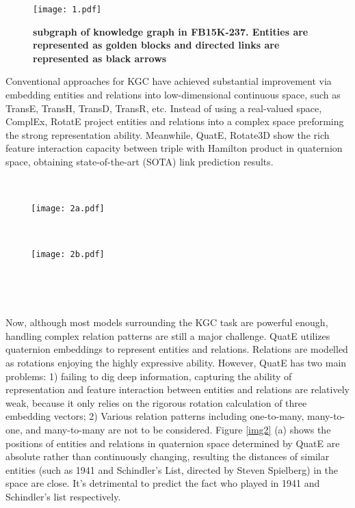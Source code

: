 \documentclass[letterpaper]{article} \usepackage{aaai20}  \usepackage{times}  \usepackage{helvet} \usepackage{courier}  \usepackage[hyphens]{url}  \usepackage{graphicx} \usepackage{lineno,hyperref,amsmath,amssymb}
\begin{document}
\begin{figure}[h]
    \centering
    \texttt{[image: 1.pdf]}
    \caption{\textbf{subgraph of knowledge graph in FB15K-237. Entities are represented as golden blocks and directed links are represented as black arrows}}
    \label{img1}
\end{figure}

Conventional approaches for KGC have achieved substantial improvement via embedding entities and relations into low-dimensional continuous space, such as TransE\cite{bordes2013translating}, TransH\cite{wang2014knowledge}, TransD\cite{ji2015knowledge}, TransR\cite{lin2015learning}, etc. Instead of using a real-valued space, ComplEx\cite{trouillon2016complex}, RotatE\cite{sun2019rotate} project entities and relations into a complex space preforming the strong representation ability. Meanwhile, QuatE\cite{zhang2019quaternion}, Rotate3D\cite{gao2020rotate3d} show the rich feature interaction capacity between triple with Hamilton product in quaternion space, obtaining state-of-the-art (SOTA) link prediction results.

\begin{figure*}[htbp]  
    \begin{minipage}[t]{0.5\linewidth}  
        \centering  
\texttt{[image: 2a.pdf]}  
        \caption*{(a) QuatE}  
    \end{minipage}\begin{minipage}[t]{0.5\linewidth}  
        \centering  
        \texttt{[image: 2b.pdf]}  
        \caption*{(b) QuatDE}  
    \end{minipage}
    \caption{\textbf{Simple illustration of QuatDE, Entities ($e_m$) and directed links ($r_n$) are represented as colored circles and black arrows, respectively. The red curves ($S_{mn}$) symbolize the dynamic mapping strategy which are determined by the elements in different triples. We draw similar entities into one dotted circle.}}  
    \label{img2}
\end{figure*}


Now, although most models surrounding the KGC task are powerful enough, handling complex relation patterns are still a major challenge. QuatE utilizes quaternion embeddings to represent entities and relations. Relations are modelled as rotations enjoying the highly expressive ability. However, QuatE has two main problems: 1) failing to dig deep information, capturing the ability of representation and feature interaction between entities and relations are relatively weak, because it only relies on the rigorous rotation calculation of three embedding vectors; 2) Various relation patterns including one-to-many, many-to-one, and many-to-many are not to be considered. Figure \ref{img2} (a) shows the positions of entities and relations in quaternion space determined by QuatE are absolute rather than continuously changing, resulting the distances of similar entities (such as 1941 and Schindler’s List, directed by Steven Spielberg) in the space are close. It’s detrimental to predict the fact who played in 1941 and Schindler’s list respectively.
\end{document}
